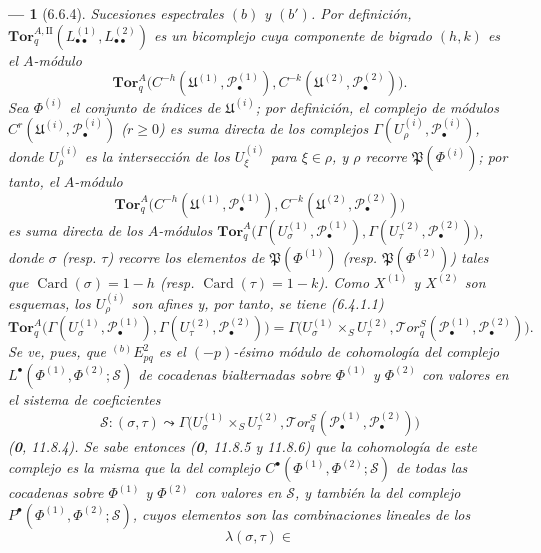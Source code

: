 \documentclass[10pt,oneside,openany]{book}
\theoremstyle{egaenv}\newtheorem*{env}{---}
\theoremstyle{egastatement}
\theoremstyle{egadescription}
\newcommand{\oldpage}[2][]{\marginnote{\normalfont\scriptsize\textbf{#1}\,|\,#2}\ignorespaces}
\begin{document}
\begin{env}[6.6.4]
\label{III.6.6.4}
\emph{Sucesiones espectrales $(b)$ y $(b')$.} Por definición,
$\mathbf{Tor}_q^{A,\mathrm{II}}
(L_{\bullet\bullet}^{(1)},L_{\bullet\bullet}^{(2)})$ es un bicomplejo cuya
componente de bigrado $(h,k)$ es el $A$-módulo
\[
  \mathbf{Tor}_q^A
  \bigl(C^{-h}(\mathfrak U^{(1)},\mathscr P_\bullet^{(1)}),
        C^{-k}(\mathfrak U^{(2)},\mathscr P_\bullet^{(2)})\bigr).
\]
Sea $\Phi^{(i)}$ el conjunto de índices de $\mathfrak U^{(i)}$; por
definición, el complejo de módulos
$C^r(\mathfrak U^{(i)},\mathscr P_\bullet^{(i)})$ ($r\geqslant0$) es suma
directa de los complejos
$\Gamma(U_\rho^{(i)},\mathscr P_\bullet^{(i)})$, donde $U_\rho^{(i)}$ es la
intersección de los $U_\xi^{(i)}$ para $\xi\in\rho$, y $\rho$ recorre
$\mathfrak P(\Phi^{(i)})$; por tanto, el $A$-módulo
\[
  \mathbf{Tor}_q^A
  \bigl(C^{-h}(\mathfrak U^{(1)},\mathscr P_\bullet^{(1)}),
        C^{-k}(\mathfrak U^{(2)},\mathscr P_\bullet^{(2)})\bigr)
\]
es suma directa de los $A$-módulos
$\mathbf{Tor}_q^A
\bigl(\Gamma(U_\sigma^{(1)},\mathscr P_\bullet^{(1)}),
\Gamma(U_\tau^{(2)},\mathscr P_\bullet^{(2)})\bigr)$,
donde $\sigma$ (resp. $\tau$) recorre los elementos de
$\mathfrak P(\Phi^{(1)})$ (resp. $\mathfrak P(\Phi^{(2)})$) tales
que $\operatorname{Card}(\sigma)=1-h$ (resp.
$\operatorname{Card}(\tau)=1-k$). Como $X^{(1)}$ y $X^{(2)}$ son
esquemas, los $U_\rho^{(i)}$ son afines y, por tanto, se tiene (6.4.1.1)
\[
  \mathbf{Tor}_q^A
  \bigl(\Gamma(U_\sigma^{(1)},\mathscr P_\bullet^{(1)}),
        \Gamma(U_\tau^{(2)},\mathscr P_\bullet^{(2)})\bigr)
  =\Gamma\bigl(U_\sigma^{(1)}\times_S U_\tau^{(2)},
    \mathscr{T}\!or_q^S
    (\mathscr P_\bullet^{(1)},\mathscr P_\bullet^{(2)})\bigr).
\]
\oldpage[III]{155}
Se ve, pues, que ${}^{(b)}E_{pq}^2$ es el $(-p)$-ésimo módulo de
cohomología del complejo
$L^\bullet(\Phi^{(1)},\Phi^{(2)};\mathscr S)$
de cocadenas \emph{bialternadas} sobre $\Phi^{(1)}$ y $\Phi^{(2)}$ con valores en el
\emph{sistema de coeficientes}
\[
  \mathscr S:(\sigma,\tau)\leadsto
  \Gamma\bigl(U_\sigma^{(1)}\times_S U_\tau^{(2)},
    \mathscr{T}\!or_q^S
    (\mathscr P_\bullet^{(1)},\mathscr P_\bullet^{(2)})\bigr)
\]
(\textbf{0}, 11.8.4). Se sabe entonces (\textbf{0}, 11.8.5 y
11.8.6) que la cohomología de este complejo es la misma que la del complejo
$C^\bullet(\Phi^{(1)},\Phi^{(2)};\mathscr S)$ de \emph{todas} las cocadenas sobre
$\Phi^{(1)}$ y $\Phi^{(2)}$ con valores en $\mathscr S$, y también la del
complejo $P^\bullet(\Phi^{(1)},\Phi^{(2)};\mathscr S)$, cuyos elementos son
las combinaciones lineales de los
\[
  \lambda(\sigma,\tau)\in
\]
\end{env}
\end{document}
